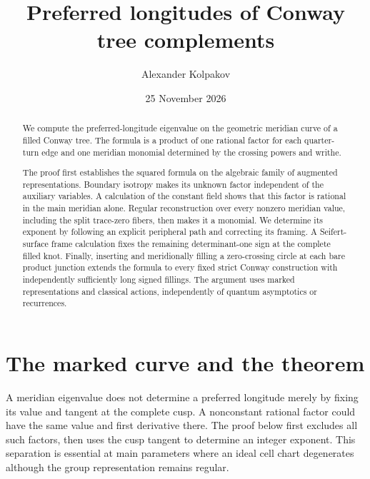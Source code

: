 \documentclass[11pt]{article}
\title{Preferred longitudes of Conway tree complements}
\author{Alexander Kolpakov}\date{25 November 2026}
\numberwithin{equation}{section}
\theoremstyle{definition}\newtheorem{definition}[theorem]{Definition}
\theoremstyle{remark}\newtheorem{remark}[theorem]{Remark}
\begin{document}
\maketitle
\begin{abstract}
We compute the preferred-longitude eigenvalue on the geometric
meridian curve of a filled Conway tree. The formula is a product of
one rational factor for each quarter-turn edge and one meridian
monomial determined by the crossing powers and writhe.

The proof first establishes the squared formula on the algebraic
family of augmented representations. Boundary isotropy makes its
unknown factor independent of the auxiliary variables. A calculation
of the constant field shows that this factor is rational in the main
meridian alone. Regular reconstruction over every nonzero meridian
value, including the split trace-zero fibers, then makes it a monomial.
We determine its exponent by following an explicit peripheral path
and correcting its framing. A Seifert-surface frame calculation fixes
the remaining determinant-one sign at the complete filled knot.
Finally, inserting and meridionally filling a zero-crossing circle at
each bare product junction extends the formula to every fixed strict
Conway construction with independently sufficiently long signed
fillings. The argument uses marked representations and classical
actions, independently of quantum asymptotics or recurrences.
\end{abstract}

\section{The marked curve and the theorem}\label{pl:introduction}
A meridian eigenvalue does not determine a preferred longitude merely by fixing its value and tangent at the complete cusp. A nonconstant rational factor could have the same value and first derivative there. The proof below first excludes all such factors, then uses the cusp tangent to determine an integer exponent. This separation is essential at main parameters where an ideal cell chart degenerates although the group representation remains regular.
\end{document}
